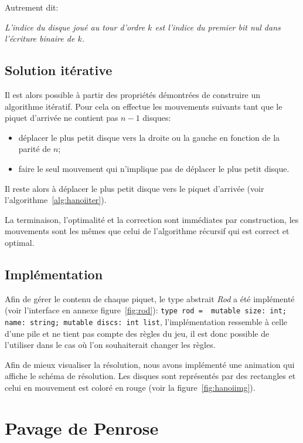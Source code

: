 \documentclass[a4paper,13pt]{article}
\begin{document}
\bigskip
Autrement dit:
\begin{center}
  \emph{L'indice du disque joué au tour d'ordre $k$ est l'indice du premier bit nul dans l'écriture binaire de $k$.}
\end{center}

\subsection{Solution itérative}

Il est alors possible à partir des propriétés démontrées de construire un algorithme itératif. Pour cela on effectue les mouvements suivants tant que le piquet d'arrivée ne contient pas $n-1$ disques:
\begin{itemize}
  \item déplacer le plus petit disque vers la droite ou la gauche en fonction de la parité de $n$;
  \item faire le seul mouvement qui n'implique pas de déplacer le plus petit disque.
\end{itemize}
Il reste alors à déplacer le plus petit disque vers le piquet d'arrivée (voir l'algorithme~\ref{alg:hanoiiter}).
\bigskip

La terminaison, l'optimalité et la correction sont immédiates par construction, les mouvements sont les mêmes que celui de l'algorithme récursif qui est correct et optimal.

\subsection{Implémentation}

Afin de gérer le contenu de chaque piquet, le type abstrait \emph{Rod} a été implémenté (voir l'interface en annexe figure~\ref{fig:rod}):
\texttt{type rod =
{ mutable size: int; name: string; mutable discs: int list}}, l'implémentation ressemble à celle d'une pile et ne tient pas compte des règles du jeu, il est donc possible de l'utiliser dans le cas où l'on souhaiterait changer les règles.\par

Afin de mieux visualiser la résolution, nous avons implémenté une animation qui affiche le schéma de résolution. Les disques sont représentés par des rectangles et celui en mouvement est coloré en rouge (voir la figure~\ref{fig:hanoiimg}).


\section{Pavage de Penrose}
\end{document}
